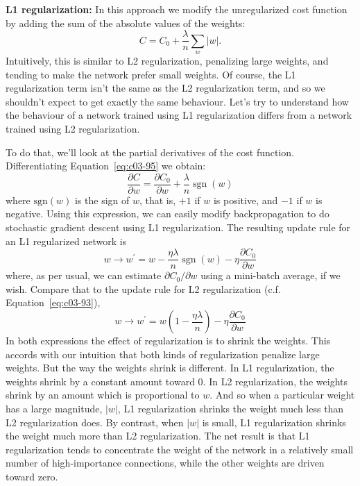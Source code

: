 \textbf{L1 regularization:} In this approach we modify the unregularized cost function by adding the sum of the absolute values of the weights:
\begin{equation}
    C=C_{0}+\frac{\lambda}{n} \sum_{w}|w|.
    \label{eq:c03-95} 
    \end{equation}
Intuitively, this is similar to L2 regularization, penalizing large weights, and tending to make the network prefer small weights. Of course, the L1 regularization term isn't the same as the L2 regularization term, and so we shouldn't expect to get exactly the same behaviour. Let's try to understand how the behaviour of a network trained using L1 regularization differs from a network trained using L2 regularization.

To do that, we'll look at the partial derivatives of the cost function. Differentiating Equation~\ref{eq:c03-95} we obtain: 
\begin{equation}
    \frac{\partial C}{\partial w}=\frac{\partial C_{0}}{\partial w}+\frac{\lambda}{n} \operatorname{sgn}(w)
    \label{eq:c03-96)}
    \end{equation}
where $\textrm{sgn}(w)$
is the sign of $w$, that is, $+1$ if $w$ is positive, and $-1$ if $w$ is negative. Using this expression, we can easily modify backpropagation to do stochastic gradient descent using L1 regularization. The resulting update rule for an L1 regularized network is 
\begin{equation}
    w \rightarrow w^{\prime}=w-\frac{\eta \lambda}{n} \operatorname{sgn}(w)-\eta \frac{\partial C_{0}}{\partial w}
    \label{eq:c03-97}
    \end{equation}
where, as per usual, we can estimate $\partial C_{0} / \partial w$  using a mini-batch average, if we wish. Compare that to the update rule for L2 regularization (c.f. Equation~\ref{eq:c03-93}), 
\begin{equation}
    w \rightarrow w^{\prime}=w\left(1-\frac{\eta \lambda}{n}\right)-\eta \frac{\partial C_{0}}{\partial w}
    \label{eq:c03-98}
    \end{equation}
In both expressions the effect of regularization is to shrink the weights. This accords with our intuition that both kinds of regularization penalize large weights. But the way the weights shrink is different. In L1 regularization, the weights shrink by a constant amount toward 0. In L2 regularization, the weights shrink by an amount which is proportional to $w$. And so when a particular weight has a large magnitude, $|w|$, L1 regularization shrinks the weight much less than L2 regularization does. By contrast, when $|w|$
is small, L1 regularization shrinks the weight much more than L2 regularization. The net result is that L1 regularization tends to concentrate the weight of the network in a relatively small number of high-importance connections, while the other weights are driven toward zero.

